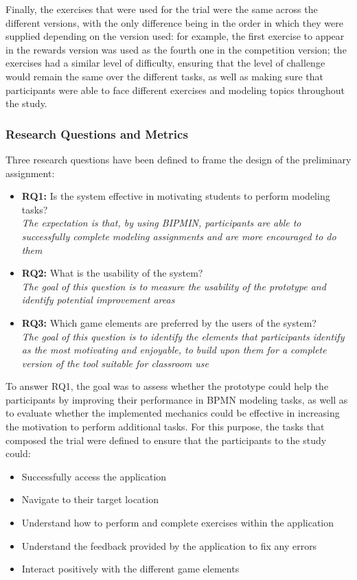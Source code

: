 Finally, the exercises that were used for the trial were the same across the different versions, with the only difference being in the order in which they were supplied depending on the version used: for example, the first exercise to appear in the rewards version was used as the fourth one in the competition version; the exercises had a similar level of difficulty, ensuring that the level of challenge would remain the same over the different tasks, as well as making sure that participants were able to face different exercises and modeling topics throughout the study.

\subsubsection{Research Questions and Metrics}

Three research questions have been defined to frame the design of the preliminary assignment:
\begin{itemize}
    \item \textbf{RQ1: } Is the system effective in motivating students to perform modeling tasks? \\
        \emph{The expectation is that, by using BIPMIN, participants are able to successfully complete modeling assignments and are more encouraged to do them}
    \item \textbf{RQ2: } What is the usability of the system?\\
        \emph{The goal of this question is to measure the usability of the prototype and identify potential improvement areas}
    \item \textbf{RQ3: } Which game elements are preferred by the users of the system?\\
        \emph{The goal of this question is to identify the elements that participants identify as the most motivating and enjoyable, to build upon them for a complete version of the tool suitable for classroom use}
\end{itemize}

To answer RQ1, the goal was to assess whether the prototype could help the participants by improving their performance in BPMN modeling tasks, as well as to evaluate whether the implemented mechanics could be effective in increasing the motivation to perform additional tasks. For this purpose, the tasks that composed the trial were defined to ensure that the participants to the study could:

\begin{itemize}
    \item Successfully access the application
    \item Navigate to their target location
    \item Understand how to perform and complete exercises within the application
    \item Understand the feedback provided by the application to fix any errors
    \item Interact positively with the different game elements
\end{itemize}

